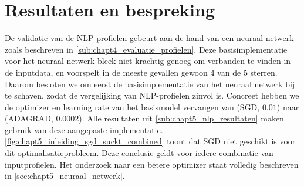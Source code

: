 \chapter{Resultaten en bespreking}
De validatie van de NLP-profielen gebeurt aan de hand van een neuraal netwerk zoals beschreven in \autoref{sub:chapt4_evaluatie_profielen}. Deze basisimplementatie voor het neuraal netwerk bleek niet krachtig genoeg om verbanden te vinden in de inputdata, en voorspelt in de meeste gevallen gewoon 4 van de 5 sterren. Daarom besloten we om eerst de basisimplementatie van het neuraal netwerk bij te schaven, zodat de vergelijking van NLP-profielen zinvol is. Concreet hebben we de optimizer en learning rate van het basismodel vervangen van (SGD, $0.01$) naar (ADAGRAD, $0.0002$). Alle resultaten uit \autoref{sub:chapt5_nlp_resultaten} maken gebruik van deze aangepaste implementatie.\newline
\autoref{fig:chapt5_inleiding_sgd_suckt_combined} toont dat SGD niet geschikt is voor dit optimalisatieprobleem. Deze conclusie geldt voor iedere combinatie van inputprofielen. Het onderzoek naar een betere optimizer staat volledig beschreven in \autoref{sec:chapt5_neuraal_netwerk}.

